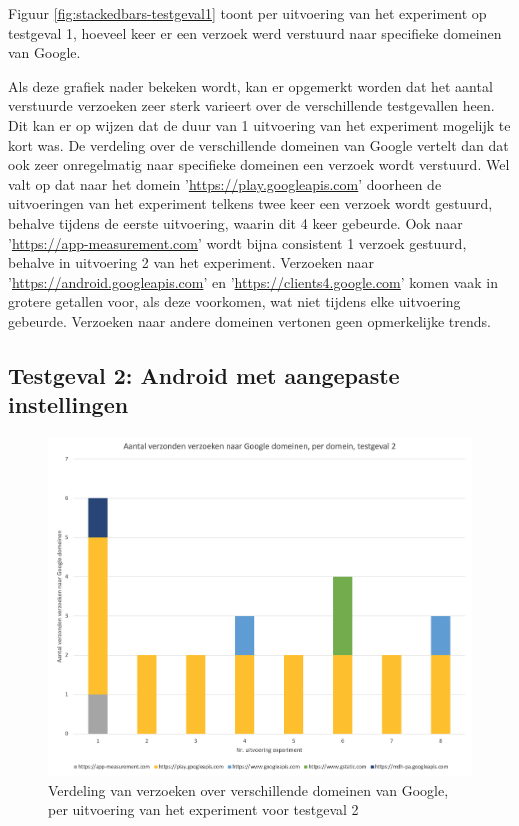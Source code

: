 Figuur \ref{fig:stackedbars-testgeval1} toont per uitvoering van het experiment op testgeval 1, hoeveel keer er een verzoek werd verstuurd naar specifieke domeinen van Google.

Als deze grafiek nader bekeken wordt, kan er opgemerkt worden dat het aantal verstuurde verzoeken zeer sterk varieert over de verschillende testgevallen heen. Dit kan er op wijzen dat de duur van 1 uitvoering van het experiment mogelijk te kort was. De verdeling over de verschillende domeinen van Google vertelt dan dat ook zeer onregelmatig naar specifieke domeinen een verzoek wordt verstuurd. Wel valt op dat naar het domein '\url{https://play.googleapis.com}' doorheen de uitvoeringen van het experiment telkens twee keer een verzoek wordt gestuurd, behalve tijdens de eerste uitvoering, waarin dit 4 keer gebeurde. Ook naar '\url{https://app-measurement.com}' wordt bijna consistent 1 verzoek gestuurd, behalve in uitvoering 2 van het experiment. Verzoeken naar '\url{https://android.googleapis.com}' en '\url{https://clients4.google.com}' komen vaak in grotere getallen voor, als deze voorkomen, wat niet tijdens elke uitvoering gebeurde. Verzoeken naar andere domeinen vertonen geen opmerkelijke trends.

\subsection{Testgeval 2: Android met aangepaste instellingen}

\begin{figure}
    \centering
    \includegraphics[width=1\textwidth]{experiment/grafieken/stackedbars-testgeval2.png}
    \caption{Verdeling van verzoeken over verschillende domeinen van Google, per uitvoering van het experiment voor testgeval 2}
    \label{fig:stackedbars-testgeval2}
\end{figure}

